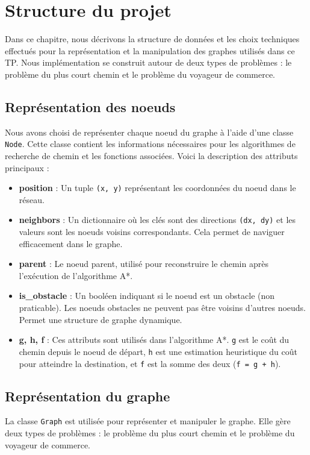\chapter{Structure du projet}
\label{chap:structure}

Dans ce chapitre, nous décrivons la structure de données et les choix techniques effectués pour la représentation et la manipulation des graphes utilisés dans ce TP. Nous implémentation se construit autour de deux types de problèmes : le problème du plus court chemin et le problème du voyageur de commerce.

\section{Représentation des noeuds}
Nous avons choisi de représenter chaque noeud du graphe à l'aide d'une classe \texttt{Node}. Cette classe contient les informations nécessaires pour les algorithmes de recherche de chemin et les fonctions associées. Voici la description des attributs principaux :

\begin{itemize}
    \item \textbf{position} : Un tuple \texttt{(x, y)} représentant les coordonnées du noeud dans le réseau.
    \item \textbf{neighbors} : Un dictionnaire où les clés sont des directions \texttt{(dx, dy)} et les valeurs sont les noeuds voisins correspondants. Cela permet de naviguer efficacement dans le graphe.
    \item \textbf{parent} : Le noeud parent, utilisé pour reconstruire le chemin après l'exécution de l'algorithme A*.
    \item \textbf{is\_obstacle} : Un booléen indiquant si le noeud est un obstacle (non praticable). Les noeuds obstacles ne peuvent pas être voisins d'autres noeuds. Permet une structure de graphe dynamique.
    \item \textbf{g, h, f} : Ces attributs sont utilisés dans l'algorithme A*. \texttt{g} est le coût du chemin depuis le noeud de départ, \texttt{h} est une estimation heuristique du coût pour atteindre la destination, et \texttt{f} est la somme des deux (\texttt{f = g + h}).
\end{itemize}

\section{Représentation du graphe}
La classe \texttt{Graph} est utilisée pour représenter et manipuler le graphe. Elle gère deux types de problèmes : le problème du plus court chemin et le problème du voyageur de commerce.

